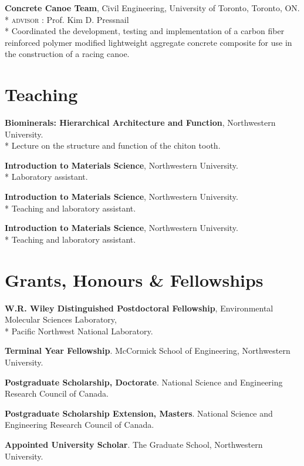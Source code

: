 \textbf{Concrete Canoe Team}, Civil Engineering, University of Toronto, Toronto, ON.\\*
\textsc{advisor} : Prof. Kim D. Pressnail\\*
Coordinated the development, testing and implementation of a carbon fiber reinforced polymer modified lightweight aggregate concrete composite for use in the construction of a racing canoe.
\endgroup

\section*{Teaching}
\textbf{Biominerals: Hierarchical Architecture and Function}, Northwestern University.\\*
\begingroup\setlength{\parskip}{0.1cm}
Lecture on the structure and function of the chiton tooth.

\textbf{Introduction to Materials Science}, Northwestern University.\\*
Laboratory assistant.

\textbf{Introduction to Materials Science}, Northwestern University.\\*
Teaching and laboratory assistant.

\textbf{Introduction to Materials Science}, Northwestern University.\\*
Teaching and laboratory assistant.
\endgroup

\section*{Grants, Honours \& Fellowships}
\textbf{W.R. Wiley Distinguished Postdoctoral Fellowship}, Environmental Molecular Sciences Laboratory,\\*  Pacific Northwest National Laboratory.

\textbf{Terminal Year Fellowship}. McCormick School of Engineering, Northwestern University.

\begingroup\setlength{\parskip}{0.1cm}
\textbf{Postgraduate Scholarship, Doctorate}. National Science and Engineering Research Council of Canada.

\textbf{Postgraduate Scholarship Extension, Masters}. National Science and Engineering Research Council of Canada.

\textbf{Appointed University Scholar}. The Graduate School, Northwestern University.


